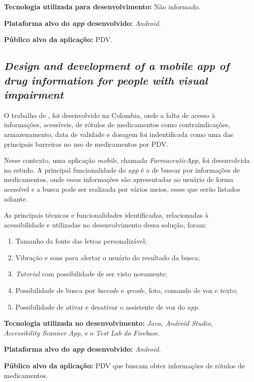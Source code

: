 \textbf{Tecnologia utilizada para desenvolvimento:} Não informado.

\textbf{Plataforma alvo do \emph{app} desenvolvido:} \emph{Android}.

\textbf{Público alvo da aplicação:} PDV\@.

\subsection{\emph{Design and development of a mobile app of drug information for people with visual impairment}}

O trabalho de , foi desenvolvido na Colombia, onde a falta de acesso à informações, acessíveis, de rótulos de medicamentos como contraindicações, armazenamento, data de validade e dosagem foi indentificada como uma das principais barreiras no uso de medicamentos por PDV\@.

Nesse contexto, uma aplicação \emph{mobile}, chamada \emph{FarmaceuticApp}, foi desenvolvida no estudo.
A principal funcionalidade do \emph{app} é a de buscar por informações de medicamentos, onde essas informações são apresentadas ao usuário de forma acessível e a busca pode ser realizada por vários meios, esses que serão listados adiante.

As principais técnicas e funcionalidades identificadas, relacionadas à acessibilidade e utilizadas no desenvolvimento dessa solução, foram:

\begin{enumerate}
\item Tamanho da fonte das letras personalizável;
\item Vibração e sons para alertar o usuário do resultado da busca;
\item \emph{Tutorial} com possibilidade de ser visto novamente;
\item Possibilidade de busca por \emph{barcode} e \emph{qrcode}, foto, comando de voz e texto;
\item Possibilidade de ativar e desativar o assistente de voz do \emph{app}.
\end{enumerate}

\textbf{Tecnologia utilizada no desenvolvimento:} \emph{Java, Android Studio, Accessibility Scanner App}, e o \emph{Test Lab do Firebase}.

\textbf{Plataforma alvo do \emph{app} desenvolvido:} \emph{Android}.

\textbf{Público alvo da aplicação:} PDV que buscam obter informações de rótulos de medicamentos\@.

